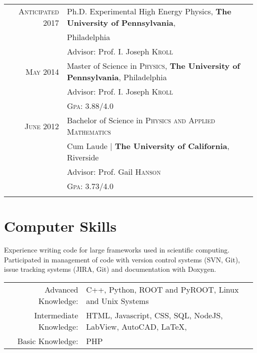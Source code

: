\documentclass[a4paper,10pt]{article} %
\begin{document}
\begin{tabular}{rl}
\textsc{Anticipated 2017} & Ph.D. Experimental High Energy Physics, \textbf{The University of Pennsylvania}, \\
                          & Philadelphia \\
&\small Advisor: Prof. I. Joseph \textsc{Kroll}\\
\vspace{1mm}


\textsc{May} 2014 & Master of Science in \textsc{Physics}, \textbf{The University of Pennsylvania}, Philadelphia\\
&\small Advisor: Prof. I. Joseph \textsc{Kroll}\\
&\normalsize \textsc{Gpa}: 3.88/4.0\\
\vspace{1mm}


\textsc{June} 2012& Bachelor of Science in \textsc{}\textsc{Physics and Applied Mathematics} \\
&Cum Laude | \normalsize\textbf{The University of California}, Riverside\\
&\small Advisor: Prof. Gail \textsc{Hanson}\\
&\normalsize \textsc{Gpa}: 3.73/4.0 \\
&\\

\end{tabular}


\section{Computer Skills}

Experience writing code for large frameworks used in scientific computing. Participated
in management of code with version control systems (SVN, Git), issue tracking systems (JIRA, Git)
and documentation with Doxygen.

\begin{tabular}{rl}

Advanced Knowledge: & C++, Python, ROOT and PyROOT, Linux and Unix Systems \\
Intermediate Knowledge: & HTML, Javascript, CSS, SQL, NodeJS, LabView, AutoCAD, \LaTeX, \\
Basic Knowledge:        & PHP
\end{tabular}
\end{document}
